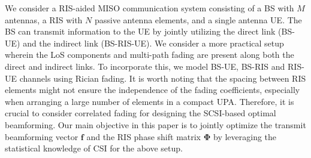 \documentclass[journal,draftclsnofoot,onecolumn,12pt]{IEEEtran}
\begin{document}
We consider a RIS-aided MISO communication system consisting of a BS with $M$ antennas, a RIS with $N$ passive antenna elements, and a single antenna UE. The BS can transmit information to the UE by jointly utilizing the direct link (BS-UE) and the indirect link (BS-RIS-UE). We consider a more practical setup wherein the LoS components and multi-path fading are present along both the direct and indirect links. To incorporate this, we model BS-UE, BS-RIS and RIS-UE channels using Rician fading. %
It is worth noting that the spacing between RIS elements might not ensure the independence of the fading coefficients, especially when arranging a large number of elements in a compact UPA. Therefore, it is crucial to consider correlated fading for designing the SCSI-based optimal beamforming. Our main objective in this paper is to jointly optimize the transmit beamforming vector $\mathbf{f}$ and the RIS phase shift matrix $\mathbf{\Phi}$ by leveraging the statistical knowledge of CSI for the above setup. %
\end{document}
